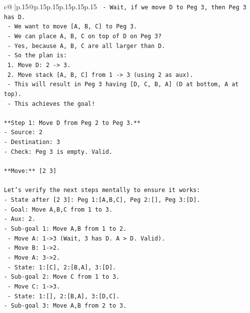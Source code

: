 \documentclass{article}
\begin{document}
{\begin{supertabular}{c@{$\;$}|p{.15\linewidth}@{}p{.15\linewidth}p{.15\linewidth}p{.15\linewidth}p{.15\linewidth}p{.15\linewidth}}
{{{\texttt{   {-} Wait, if we move D to Peg 3, then Peg 3 has D.} \\
\texttt{   {-} We want to move {[}A, B, C{]} to Peg 3.} \\
\texttt{   {-} We can place A, B, C on top of D on Peg 3?} \\
\texttt{   {-} Yes, because A, B, C are all larger than D.} \\
\texttt{   {-} So the plan is:} \\
\texttt{     1. Move D: 2 {-}> 3.} \\
\texttt{     2. Move stack {[}A, B, C{]} from 1 {-}> 3 (using 2 as aux).} \\
\texttt{        {-} This will result in Peg 3 having {[}D, C, B, A{]} (D at bottom, A at top).} \\
\texttt{        {-} This achieves the goal!} \\
\\ 
\texttt{**Step 1: Move D from Peg 2 to Peg 3.**} \\
\texttt{{-} Source: 2} \\
\texttt{{-} Destination: 3} \\
\texttt{{-} Check: Peg 3 is empty. Valid.} \\
\\ 
\texttt{**Move:** {[}2 3{]}} \\
\\ 
\texttt{Let's verify the next steps mentally to ensure it works:} \\
\texttt{{-} State after {[}2 3{]}: Peg 1:{[}A,B,C{]}, Peg 2:{[}{]}, Peg 3:{[}D{]}.} \\
\texttt{{-} Goal: Move A,B,C from 1 to 3.} \\
\texttt{{-} Aux: 2.} \\
\texttt{{-} Sub{-}goal 1: Move A,B from 1 to 2.} \\
\texttt{  {-} Move A: 1{-}>3 (Wait, 3 has D. A > D. Valid).} \\
\texttt{  {-} Move B: 1{-}>2.} \\
\texttt{  {-} Move A: 3{-}>2.} \\
\texttt{  {-} State: 1:{[}C{]}, 2:{[}B,A{]}, 3:{[}D{]}.} \\
\texttt{{-} Sub{-}goal 2: Move C from 1 to 3.} \\
\texttt{  {-} Move C: 1{-}>3.} \\
\texttt{  {-} State: 1:{[}{]}, 2:{[}B,A{]}, 3:{[}D,C{]}.} \\
\texttt{{-} Sub{-}goal 3: Move A,B from 2 to 3.} \\
}}}
\end{supertabular}}
\end{document}
